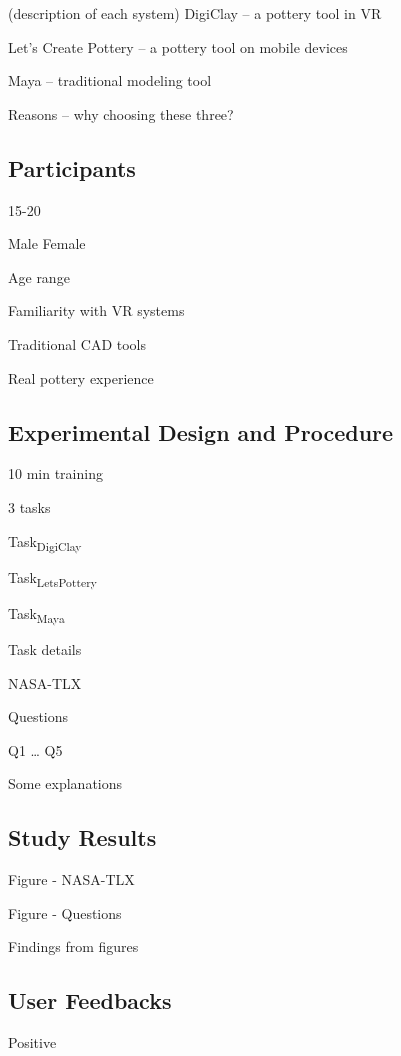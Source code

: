 (description of each system)
DigiClay – a pottery tool in VR

Let’s Create Pottery – a pottery tool on mobile devices

Maya – traditional modeling tool

Reasons – why choosing these three?



\subsection{Participants}
\label{sec:2}

15-20

Male Female

Age range

Familiarity with VR systems

Traditional CAD tools 

Real pottery experience



\subsection{Experimental Design and Procedure}
\label{sec:2}

10 min training

3 tasks

Task\textsubscript{DigiClay}

Task\textsubscript{LetsPottery}

Task\textsubscript{Maya}

Task details

NASA-TLX

Questions

Q1
…
Q5

Some explanations




\subsection{Study Results}
\label{sec:2}

Figure - NASA-TLX

Figure - Questions

Findings from figures


\subsection{User Feedbacks}
\label{sec:2}

Positive

